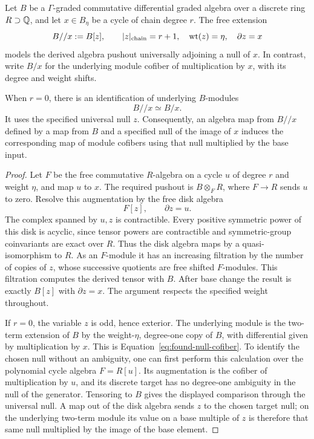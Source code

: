 \begin{lemma}\label{found:free-null}
Let $B$ be a $\Gamma$-graded commutative differential graded algebra
over a discrete ring $R\supset\mathbb Q$, and let $x\in B_\eta$ be a cycle
of chain degree $r$.  The free extension
\[
 B//x:=B[z],\qquad
 |z|_{\mathrm{chain}}=r+1,\quad \operatorname{wt}(z)=\eta,\quad
 \partial z=x
\]
models the derived algebra pushout universally adjoining a null of
$x$.  In contrast, write $B/x$ for the underlying module cofiber of
multiplication by $x$, with its degree and weight shifts.

When $r=0$, there is an identification of underlying $B$-modules
\begin{equation}\label{eq:found-null-cofiber}
 B//x\simeq B/x.
\end{equation}
It uses the specified universal null $z$.  Consequently, an algebra
map from $B//x$ defined by a map from $B$ and a specified null of the
image of $x$ induces the corresponding map of module cofibers using
that null multiplied by the base input.
\end{lemma}

\begin{proof}
Let $F$ be the free commutative $R$-algebra on a cycle $u$ of degree
$r$ and weight $\eta$, and map $u$ to $x$.  The required pushout is
$B\otimes_F R$, where $F\to R$ sends $u$ to zero.  Resolve this
augmentation by the free disk algebra
\[
 F[z],\qquad \partial z=u.
\]
The complex spanned by $u,z$ is contractible.  Every positive symmetric
power of this disk is acyclic, since tensor powers are contractible
and symmetric-group coinvariants are exact over $R$.  Thus the disk
algebra maps by a quasi-isomorphism to $R$.
As an $F$-module it has an increasing filtration by the number of
copies of $z$, whose successive quotients are free shifted
$F$-modules.  This filtration computes the derived tensor with $B$.
After base change the result is exactly $B[z]$ with $\partial z=x$.
The argument respects the specified weight throughout.

If $r=0$, the variable $z$ is odd, hence exterior.  The underlying
module is the two-term extension of $B$ by the weight-$\eta$, degree-one
copy of $B$, with differential given by multiplication by $x$.  This
is Equation~\eqref{eq:found-null-cofiber}.  To identify the chosen
null without an ambiguity, one can first perform this calculation
over the polynomial cycle algebra $F=R[u]$.  Its augmentation is the
cofiber of multiplication by $u$, and its discrete target has no
degree-one ambiguity in the null of the generator.  Tensoring to $B$
gives the displayed comparison through the universal null.  A map
out of the disk algebra sends $z$ to the chosen target null; on the
underlying two-term module its value on a base multiple of $z$ is
therefore that same null multiplied by the image of the base element.
\end{proof}

